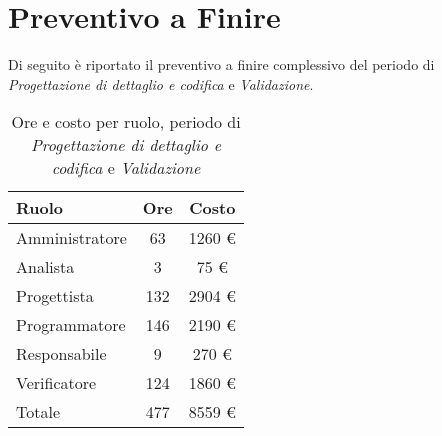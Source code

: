 \section{Preventivo a Finire}
Di seguito è riportato il preventivo a finire complessivo del periodo di \textit{Progettazione di dettaglio e codifica} e \textit{Validazione}.

\begin{table}[H]
	\centering
	\begin{tabular}{ l c c }
		\textbf{Ruolo} & \textbf{Ore} & \textbf{Costo} \\
		\hline
		Amministratore & 63 & 1260 \euro{} \\
		Analista & 3 & 75 \euro{} \\
		Progettista & 132 & 2904 \euro{} \\
		Programmatore & 146 & 2190 \euro{} \\
		Responsabile & 9 & 270 \euro{} \\
		Verificatore & 124 & 1860 \euro{} \\
		\hline
		Totale & 477 & 8559 \euro{} \\
		\hline
	\end{tabular}
	\caption{Ore e costo per ruolo, periodo di \textit{Progettazione di dettaglio e codifica} e \textit{Validazione}}
\end{table}